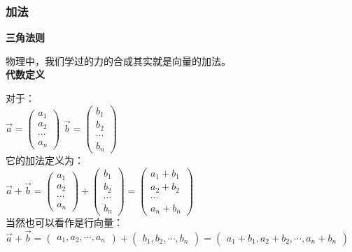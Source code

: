 \documentclass[UTF8]{ctexart}
\begin{document}
\subsubsection{加法}

\textbf{三角法则}

物理中，我们学过的力的合成其实就是向量的加法。 \\

\textbf{代数定义}

对于：\\

$\vec{a}=\begin{pmatrix} a_{1} \\ a_{2} \\ \cdots \\ a_{n} \end{pmatrix}$  \qquad
$\vec{b}=\begin{pmatrix} b_{1} \\ b_{2} \\ \cdots \\ b_{n} \end{pmatrix}$\\

它的加法定义为：\\

$\vec{a}+\vec{b}
=\begin{pmatrix} a_{1} \\ a_{2} \\ \cdots \\ a_{n} \end{pmatrix} +
\begin{pmatrix} b_{1} \\ b_{2} \\ \cdots \\ b_{n} \end{pmatrix}
=\begin{pmatrix} a_{1}+b_{1} \\ a_{2}+b_{2} \\ \cdots \\ a_{n}+b_{n} \end{pmatrix}$\\

当然也可以看作是行向量：\\

$\vec{a}+\vec{b}=\begin{pmatrix} a_{1},a_{2},\cdots,a_{n} \end{pmatrix} +
\begin{pmatrix} b_{1},b_{2},\cdots,b_{n} \end{pmatrix}
=\begin{pmatrix} a_{1}+b_{1},a_{2}+b_{2},\cdots,a_{n}+b_{n} \end{pmatrix}$\\
\end{document}
